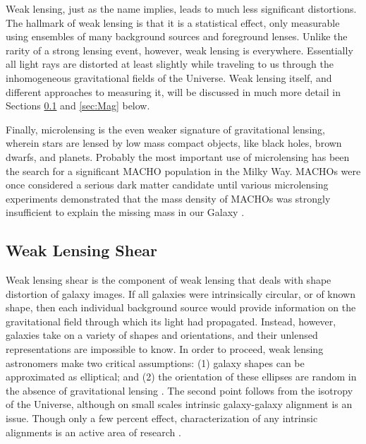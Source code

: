 Weak lensing, just as the name implies, leads to much less significant distortions. The hallmark of weak lensing is that it is a statistical effect, only measurable using ensembles of many background sources and foreground lenses. Unlike the rarity of a strong lensing event, however, weak lensing is everywhere. Essentially all light rays are distorted at least slightly while traveling to us through the inhomogeneous gravitational fields of the Universe. Weak lensing itself, and different approaches to measuring it, will be discussed in much more detail in Sections \ref{sec:Shear} and \ref{sec:Mag} below. 

Finally, microlensing is the even weaker signature of gravitational lensing, wherein stars are lensed by low mass compact objects, like black holes, brown dwarfs, and planets. Probably the most important use of microlensing has been the search for a significant \acf{MACHO} population in the Milky Way. \ac{MACHO}s were once considered a serious dark matter candidate until various microlensing experiments demonstrated that the mass density of \ac{MACHO}s was strongly insufficient to explain the missing mass in our Galaxy \citep{Paczynski96,Wyrzykowski11,Sumi13}.


\subsection{Weak Lensing Shear}
\label{sec:Shear}

Weak lensing shear is the component of weak lensing that deals with shape distortion of galaxy images. If all galaxies were intrinsically circular, or of known shape, then each individual background source would provide information on the gravitational field through which its light had propagated. Instead, however, galaxies take on a variety of shapes and orientations, and their unlensed representations are impossible to know. In order to proceed, weak lensing astronomers make two critical assumptions: (1) galaxy shapes can be approximated as elliptical; and (2) the orientation of these ellipses are random in the absence of gravitational lensing \citep{BS01}. The second point follows from the isotropy of the Universe, although on small scales intrinsic galaxy-galaxy alignment is an issue. Though only a few percent effect, characterization of any intrinsic alignments is an active area of research \citep[see e.g.][]{Hirata04,Heymans13}.

